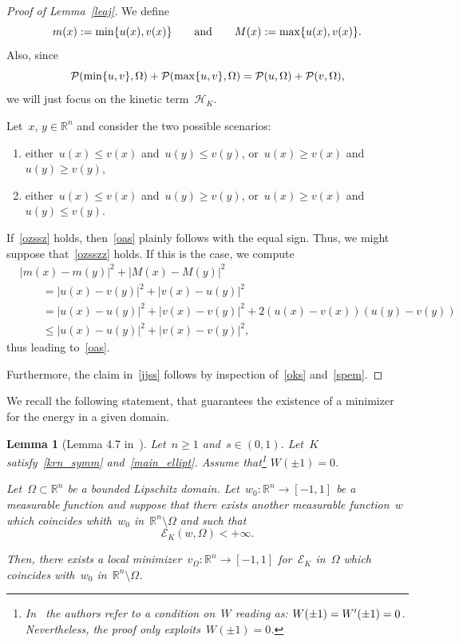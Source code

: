 \documentclass[10pt,a4paper]{amsart}
\newtheorem{lemma}[theorem]{Lemma}
\numberwithin{equation}{section}
\newcommand{\R}{\mathbb{R}}
\newcommand{\Ec}{\mathcal{E}_K}
\newcommand{\Hc}{\mathcal{H}_K}
\newcommand{\Pc}{\mathcal{P}}
\begin{document}
\begin{proof}[Proof of Lemma~\ref{leaj}]
We define
\begin{equation}\label{wisk}
m(x):= {\rm min}\{u(x),v(x)\} \qquad\mbox{and}\qquad M(x):={\rm max}\{u(x),v(x)\}.
\end{equation}
Also, since
\begin{equation}\label{oks}
\Pc({\rm min}\{u,v\},\Omega) +\Pc({\rm max}\{u,v\},\Omega) = \Pc(u, \Omega) + \Pc(v,\Omega),
\end{equation}
we will just focus on the kinetic term~$\Hc$.

Let~$x$, $y\in\R^n$ and consider the two possible scenarios:
\begin{enumerate}[\rm(i)]
        \item either~$u(x) \leq v(x)$ and~$u(y) \leq v(y)$, or~$u(x)\ge v(x)$ and~$u(y) \ge v(y)$,
        \label{ozssz}
        \item either~$u(x) \leq v(x)$ and~$u(y)\ge v(y)$, or~$u(x)\ge v(x)$ and~$u(y) \leq v(y)$.\label{ozsszz}
    \end{enumerate}
If~\eqref{ozssz} holds, then~\eqref{oas} plainly follows with the equal sign. Thus, we might suppose that~\eqref{ozsszz} holds. If this is the case, we compute
\begin{equation}\label{spem}
\begin{split}
&|m(x)-m(y)|^2 + | M(x) - M(y)|^2 \\
&\qquad= |u(x)-v(y)|^2 + |v(x) - u(y)|^2 \\
&\qquad= | u(x)-u(y)|^2 + | v(x) - v(y)|^2 + 2 \left( u(x) - v(x) \right) \left( u(y)-v(y)\right) \\
&\qquad \leq |u(x)-u(y)|^2 + | v(x) - v(y)|^2,
\end{split}
\end{equation}
thus leading to~\eqref{oas}.

Furthermore, the claim in~\eqref{jjss} follows by inspection of~\eqref{oks} and~\eqref{spem}.
\end{proof}

We recall the following statement, that guarantees
the existence of a minimizer for the energy in a given domain.

\begin{lemma}[Lemma 4.7 in~\cite{CP16}]\label{en_minimiz}
Let~$n\geq1$ and~$s \in(0,1)$. Let~$K$ satisfy~\eqref{krn_symm} and~\eqref{main_ellipt}. Assume that\footnote{In~\cite{CP16} the authors refer to a condition on~$W$ reading as: $ W(\pm 1)= W\rq{}(\pm 1)=0$. Nevertheless, the proof only exploits~$W(\pm 1)=0$.} $W(\pm 1) =0$.

Let~$\Omega \subset \R^n$ be a bounded Lipschitz domain. 
Let~$w_0 : \R^n \to [-1,1]$ be a measurable function and
suppose that there exists another measurable function~$w$ which coincides whith~$w_0$ in~$\R^n \setminus \Omega$ and such that
$$ \Ec (w, \Omega)< +\infty.$$

Then, there exists a local minimizer~$v_{\Omega}: \R^n \to [-1,1]$ for~$\Ec$ in~$\Omega$ which coincides with~$w_0$ in~$\R^n \setminus \Omega$.
\end{lemma}
\end{document}
